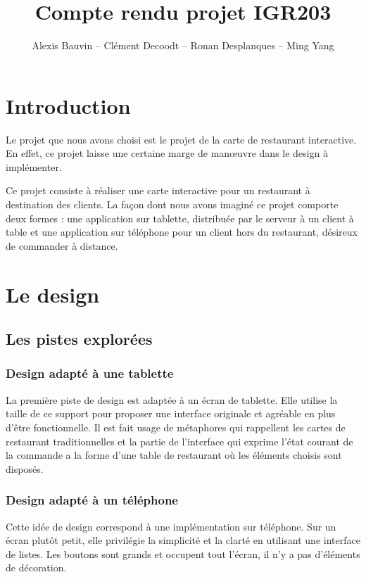 \documentclass[a4paper,12pt]{article}
\title{Compte rendu projet IGR203}
\author{Alexis Bauvin -- Clément Decoodt -- Ronan Desplanques -- Ming Yang}
\begin{document}
\maketitle

\tableofcontents

\section*{Introduction}

Le projet que nous avons choisi est le projet de la carte de restaurant interactive. En effet, ce projet laisse une
certaine marge de manœuvre dans le design à implémenter.

Ce projet consiste à réaliser une carte interactive pour un restaurant à destination des clients. La façon dont nous
avons imaginé ce projet comporte deux formes : une application sur tablette, distribuée par le serveur à un client à
table et une application sur téléphone pour un client hors du restaurant, désireux de commander à distance.

\newpage

\section{Le design}

\subsection{Les pistes explorées}

\subsubsection{Design adapté à une tablette}

La première piste de design est adaptée à un écran de tablette. Elle utilise la taille de ce support pour proposer
une interface originale et agréable en plus d'être fonctionnelle. Il est fait usage de métaphores qui rappellent
les cartes de restaurant traditionnelles et la partie de l'interface qui exprime l'état courant de la commande
a la forme d'une table de restaurant où les éléments choisis sont disposés.

\subsubsection{Design adapté à un téléphone}

Cette idée de design correspond à une implémentation sur téléphone. Sur un écran plutôt petit, elle privilégie la
simplicité et la clarté en utilisant une interface de listes. Les boutons sont grands et occupent tout l'écran,
il n'y a pas d'éléments de décoration.
\end{document}
